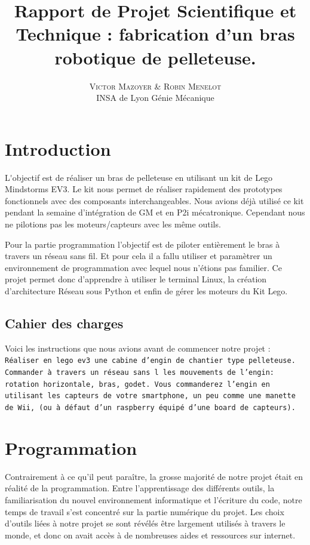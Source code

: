 \documentclass[twoside,twocolumn, 16pt]{article}
\title{Rapport de Projet Scientifique et Technique : fabrication d'un bras robotique de pelleteuse.} %
\author{%
\textsc{Victor Mazoyer \& Robin Menelot} \\[1ex] %
\normalsize INSA de Lyon \quad Génie Mécanique \\ %
}
\date{} %
\begin{document}
\maketitle


\section{Introduction}

\lettrine[nindent=0em,lines=3]{L}'objectif est de réaliser un bras de pelleteuse en utilisant un kit de Lego Mindstorms EV3. 
Le kit nous permet de réaliser rapidement des prototypes fonctionnels avec des composants interchangeables.  Nous avions déjà utilisé ce kit pendant la semaine d'intégration de GM et en P2i mécatronique. Cependant nous ne pilotions pas les moteurs/capteurs avec les même outils.

Pour la partie programmation l'objectif est de piloter entièrement le bras à travers un réseau sans fil. Et pour cela il a fallu utiliser et paramètrer un environnement de programmation avec lequel nous n'étions pas familier. Ce projet permet donc d'apprendre à utiliser le terminal Linux, la création d'architecture Réseau sous Python et enfin de gérer les moteurs du Kit Lego.

\subsection{Cahier des charges}
\begin{displayquote}
Voici les instructions que nous avions avant de commencer notre projet : \\
\texttt{Réaliser en lego ev3 une cabine d'engin de chantier type pelleteuse. Commander à travers un réseau sans l les mouvements de l'engin: rotation horizontale, bras, godet. Vous commanderez l'engin en utilisant les capteurs de votre smartphone, un peu comme une manette de Wii, (ou à défaut d'un raspberry équipé d'une board de capteurs).}
\end{displayquote}

\section{Programmation}
Contrairement à ce qu’il peut paraître, la grosse majorité de notre projet était en réalité de la programmation. Entre l’apprentissage des différents outils, la familiarisation du nouvel environnement informatique et l’écriture du code, notre temps de travail s’est concentré sur la partie numérique du projet. Les choix d’outils liées à notre projet se sont révélés être largement utilisés à travers le monde, et donc on avait accès à de nombreuses aides et ressources sur internet.
\end{document}
